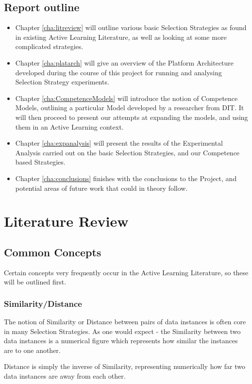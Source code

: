 \documentclass[a4paper,11pt]{report}
\begin{document}
\section{Report outline}
\begin{itemize}
	\item Chapter \ref{cha:litreview} will outline various basic Selection Strategies as found in existing Active Learning Literature, as well as looking at some more complicated strategies.
	\item Chapter \ref{cha:platarch} will give an overview of the Platform Architecture developed during the course of this project for running and analysing Selection Strategy experiments.
	\item Chapter \ref{cha:CompetenceModels} will introduce the notion of Competence Models, outlining a particular Model developed by a researcher from DIT. It will then proceed to present our attempts at expanding the models, and using them in an Active Learning context.
	\item Chapter \ref{cha:expanalysis} will present the results of the Experimental Analysis carried out on the basic Selection Strategies, and our Competence based Strategies.
	\item Chapter \ref{cha:conclusions} finishes with the conclusions to the Project, and potential areas of future work that could in theory follow.
\end{itemize}

\chapter{Literature Review\label{cha:litreview}}

\section{Common Concepts}
Certain concepts very frequently occur in the Active Learning Literature, so these will be outlined first.

\subsection{Similarity/Distance}
The notion of Similarity or Distance between pairs of data instances is often core in many Selection Strategies. As one would expect - the Similarity between two data instances is a numerical figure which represents how similar the instances are to one another.

Distance is simply the inverse of Similarity, representing numerically how far two data instances are away from each other.
\end{document}
